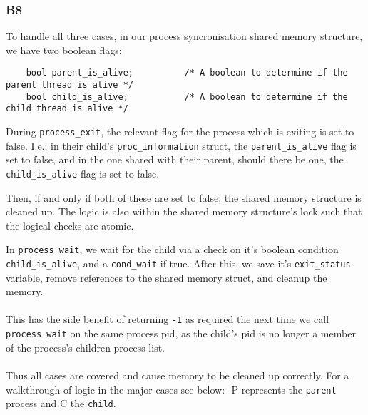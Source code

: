 \documentclass[a4wide, 11pt]{article}
\newcommand{\tx}{\texttt}
\begin{document}
\subsubsection{B8}

To handle all three cases, in our process syncronisation shared memory structure, we have two boolean flags:

\begin{verbatim}
    bool parent_is_alive;          /* A boolean to determine if the parent thread is alive */
    bool child_is_alive;           /* A boolean to determine if the child thread is alive */
\end{verbatim}

During \tx{process\_exit}, the relevant flag for the process which is exiting is set to false. I.e.: in their child's \tx{proc\_information} struct, the \tx{parent\_is\_alive} flag is set to false, and in the one shared with their parent, should there be one, the \tx{child\_is\_alive} flag is set to false.

Then, if and only if both of these are set to false, the shared memory structure is cleaned up. The logic is also within the shared memory structure's lock such that the logical checks are atomic.

In \tx{process\_wait}, we wait for the child via a check on it's boolean condition \texttt{child\_is\_alive}, and a \texttt{cond\_wait} if true. After this, we save it's \texttt{exit\_status} variable, remove references to the shared memory struct, and cleanup the memory.
\\\\
This has the side benefit of returning \tx{-1} as required the next time we call \texttt{process\_wait} on the same process pid, as the child's pid is no longer a member of the process's children process list.
\\\\
Thus all cases are covered and cause memory to be cleaned up correctly. For a walkthrough of logic in the major cases see below:- P represents the \texttt{parent} process and C the \texttt{child}.
\end{document}
